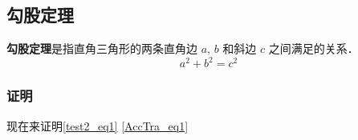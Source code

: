 
\subsection{勾股定理}
\textbf{勾股定理}是指直角三角形的两条直角边 $a$, $b$ 和斜边 $c$ 之间满足的关系．
\begin{equation}\label{test2_eq1}
a^2+b^2=c^2
\end{equation}
\subsubsection{证明}
现在来证明\autoref{test2_eq1} \autoref{AccTra_eq1}~